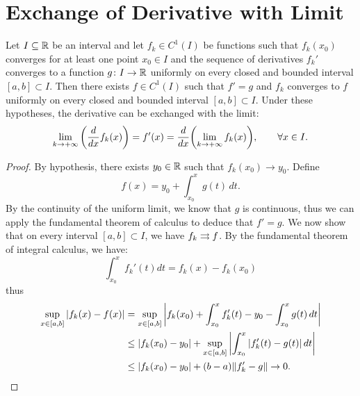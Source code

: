 \section{Exchange of Derivative with Limit}

\begin{theorem}
\mymark{***}
Let $I\subseteq {\mathbb R}$ be an interval and let $f_k\in C^1(I)$ be functions such that
$f_k(x_0)$ converges for at least one point $x_0\in I$ and the sequence of
derivatives $f_k'$ converges to a function $g\colon I \to {\mathbb R}$ uniformly on
every closed and bounded interval $[a,b]\subset I$. Then there exists $f\in
C^1(I)$ such that $f'=g$ and $f_k$ converges to $f$ uniformly on every closed
and bounded interval $[a,b]\subset I$. Under these hypotheses, the derivative
can be exchanged with the limit:
\[
  \lim_{k\to +\infty}{\left( \frac{d}{dx} f_k(x) \right)}
  = f'(x)
  = \frac{d}{dx} {\left( \lim_{k\to +\infty} f_k(x) \right)},
  \qquad \forall x \in I.
\]
\end{theorem}
%
\begin{proof}
\mymark{***}
By hypothesis, there exists $y_0\in {\mathbb R}$ such that $f_k(x_0) \to y_0$. Define
\[
  f(x) = y_0 + \int_{x_0}^x g(t)\, dt.
\]
By the continuity of the uniform limit, we know that $g$ is continuous, thus we
can apply the fundamental theorem of calculus to deduce that $f'=g$. We now show
that on every interval $[a,b]\subset I$, we have $f_k \rightrightarrows f$. By the fundamental
theorem of integral calculus, we have:
\[
  \int_{x_0}^x f_k'(t) dt = f_k(x) - f_k(x_0)
\]
thus
\begin{align*}
  \sup_{x\in [a,b]}{\left|f_k(x) - f(x)\right|}
    &= \sup_{x\in [a,b]} {\left|f_k(x_0) + \int_{x_0}^x f_k'(t) - y_0 -
  \int_{x_0}^x g(t)\, dt\right|} \\
    &\le {\left|f_k(x_0) - y_0\right|} + \sup_{x\in [a,b]}{\left|\int_{x_0}^x {\left|f_k'(t)
  - g(t)\right|}\, dt\right|} \\
  &\le {\left|f_k(x_0) - y_0\right|} + (b-a){\left\Vert f_k' - g\right\Vert} \to 0.
\end{align*}
\end{proof}

